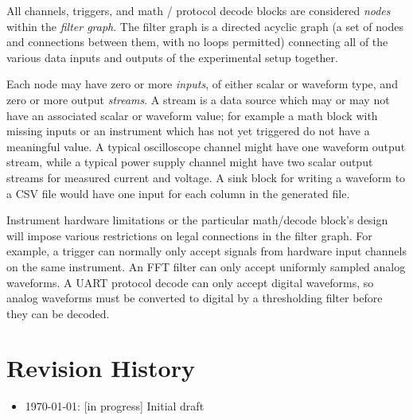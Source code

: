 All channels, triggers, and math / protocol decode blocks are considered \emph{nodes} within the \emph{filter graph}.
The filter graph is a directed acyclic graph (a set of nodes and connections between them, with no loops permitted)
connecting all of the various data inputs and outputs of the experimental setup together.

Each node may have zero or more \emph{inputs}, of either scalar or waveform type, and zero or more output
\emph{streams}. A stream is a data source which may or may not have an associated scalar or waveform value; for example
a math block with missing inputs or an instrument which has not yet triggered do not have a meaningful value. A typical
oscilloscope channel might have one waveform output stream, while a typical power supply channel might have two scalar
output streams for measured current and voltage. A sink block for writing a waveform to a CSV file would have one input
for each column in the generated file.

Instrument hardware limitations or the particular math/decode block's design will impose various restrictions on legal
connections in the filter graph. For example, a trigger can normally only accept signals from hardware input channels
on the same instrument. An FFT filter can only accept uniformly sampled analog waveforms. A UART protocol decode can
only accept digital waveforms, so analog waveforms must be converted to digital by a thresholding filter before they
can be decoded.

\section{Revision History}
\begin{itemize}
\item \today: [in progress] Initial draft
\end{itemize}

